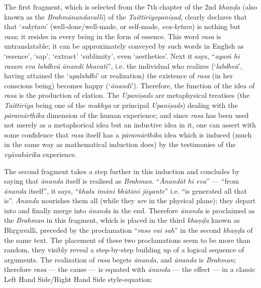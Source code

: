 The first fragment, which is selected from the 7th chapter of the 2nd \textsl{khaṇḍa} (also known as the \textsl{Brahmānandavallī}) of the \textsl{Taittirīyopaniṣad},
 clearly declares that that ‘\textsl{sukṛtam}’ (well-done/well-made, or self-made, \textsl{sva-kṛtam}) is nothing but \textsl{rasa}; it resides in every being in the form of essence. This word \textsl{rasa} is untranslatable; it can be approximately conveyed by such words in English as ‘essence’, ‘sap’, ‘extract’ ‘sublimity’, even ‘aesthetics’. Next it says, “\textsl{ayaṁ hi rasam eva labdhvā ānandī bhavati}”, i.e. the individual who realizes (‘\textsl{labdhvā}’, having attained the ‘\textsl{upalabdhi}’ or realization) the existence of \textsl{rasa} (in her conscious being) becomes happy (‘\textsl{ānandī}’). Therefore, the function of the idea of \textsl{rasa} is the production of elation. The \textsl{Upaniṣads} are metaphysical treatises (the \textsl{Taittirīya} being one of the \textsl{mukhya} or principal \textsl{Upaniṣads}) dealing with the \textsl{pāramārthika} dimension of the human experience; and since \textsl{rasa} has been used not merely as a metaphorical idea but an inductive idea in it, one can assert with some confidence that \textsl{rasa} itself has a \textsl{pāramārthika} idea which is induced (much in the same way as mathematical induction does) by the testimonies of the \textsl{vyāvahārika} experience. 

The second fragment takes a step further in this induction and concludes by saying that \textsl{ānanda} itself is realised as \textsl{Brahman}. “\textsl{Ānandāt hi eva}” --- “from \textsl{ānanda} itself”, it says, “\textsl{khalu imāni bhūtāni jāyante}” i.e. “is generated all that is”. \textsl{Ānanda} nourishes them all (while they \textsl{are} in the physical plane); they depart into and finally merge into \textsl{ānanda} in the end. Therefore \textsl{ānanda} is proclaimed as the \textsl{Brahman} in this fragment, which is placed in the third \textsl{khaṇḍa} known as Bhṛguvallī, preceded by the proclamation “\textsl{raso vai sah}” in the second \textsl{khaṇḍa} of the same text. The placement of these two proclamations seem to be more than random, they visibly reveal a step-by-step building up of a logical sequence of arguments. The realization of \textsl{rasa} begets \textsl{ānanda}, and \textsl{ānanda} is \textsl{Brahman}; therefore \textsl{rasa} --- the cause --- is equated with \textsl{ānanda} --- the effect --- in a classic Left Hand Side/Right Hand Side style-equation: 

